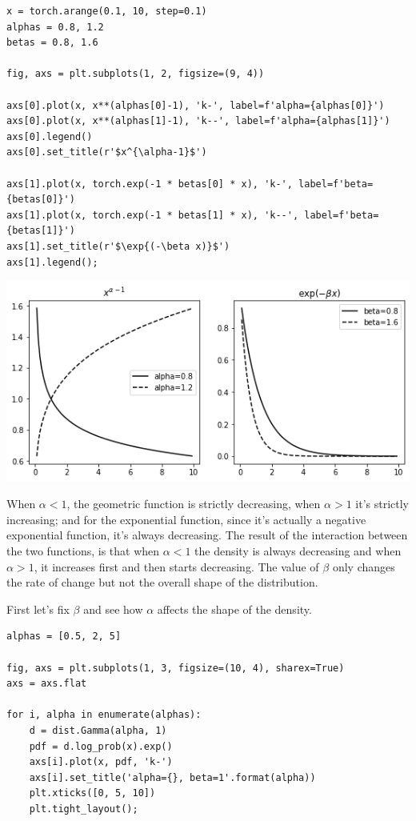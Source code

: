 \documentclass[11pt]{article}
\begin{document}
\begin{verbatim}
x = torch.arange(0.1, 10, step=0.1)
alphas = 0.8, 1.2
betas = 0.8, 1.6

fig, axs = plt.subplots(1, 2, figsize=(9, 4))

axs[0].plot(x, x**(alphas[0]-1), 'k-', label=f'alpha={alphas[0]}')
axs[0].plot(x, x**(alphas[1]-1), 'k--', label=f'alpha={alphas[1]}')
axs[0].legend()
axs[0].set_title(r'$x^{\alpha-1}$')

axs[1].plot(x, torch.exp(-1 * betas[0] * x), 'k-', label=f'beta={betas[0]}')
axs[1].plot(x, torch.exp(-1 * betas[1] * x), 'k--', label=f'beta={betas[1]}')
axs[1].set_title(r'$\exp{(-\beta x)}$')
axs[1].legend();
\end{verbatim}

\begin{center}
\includegraphics[width=.9\linewidth]{./.ob-jupyter/319aa3e48a825e567e7c63b0e68bdd3210ce6872.png}
\end{center}

When \(\alpha < 1\), the geometric function is strictly decreasing, when \(\alpha > 1\) it's strictly increasing; and for the exponential function, since it's actually a negative exponential function, it's always decreasing. The result of the interaction between the two functions, is that when \(\alpha < 1\) the density is always decreasing and when \(\alpha > 1\), it increases first and then starts decreasing. The value of \(\beta\) only changes the rate of change but not the overall shape of the distribution.

First let's fix \(\beta\) and see how \(\alpha\) affects the shape of the density.

\begin{verbatim}
alphas = [0.5, 2, 5]

fig, axs = plt.subplots(1, 3, figsize=(10, 4), sharex=True)
axs = axs.flat

for i, alpha in enumerate(alphas):
    d = dist.Gamma(alpha, 1)
    pdf = d.log_prob(x).exp()
    axs[i].plot(x, pdf, 'k-')
    axs[i].set_title('alpha={}, beta=1'.format(alpha))
    plt.xticks([0, 5, 10])
    plt.tight_layout();
\end{verbatim}
\end{document}
